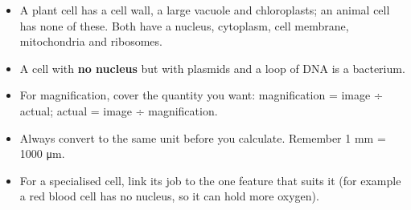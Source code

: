 \documentclass[11pt]{article}
\begin{document}
\begin{itemize}
\item A plant cell has a cell wall, a large vacuole and chloroplasts; an animal cell has none of these. Both have a nucleus, cytoplasm, cell membrane, mitochondria and ribosomes.

\item A cell with \textbf{no nucleus} but with plasmids and a loop of DNA is a bacterium.

\item For magnification, cover the quantity you want: magnification = image ÷ actual; actual = image ÷ magnification.

\item Always convert to the same unit before you calculate. Remember 1 mm = 1000 μm.

\item For a specialised cell, link its job to the one feature that suits it (for example a red blood cell has no nucleus, so it can hold more oxygen).

\end{itemize}
\end{document}
